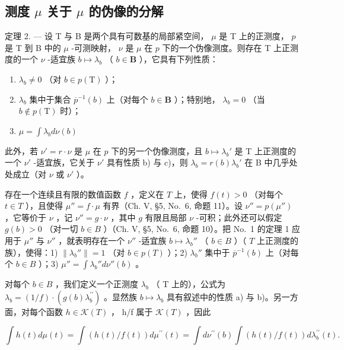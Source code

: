 \subsection{\texorpdfstring{测度 \(\mu\) 关于 \(\mu\) 的伪像的分解}{测度 mu 关于 mu 的伪像的分解}}

定理 2. --- 设 T 与 B 是两个具有可数基的局部紧空间， \(\mu\) 是 T 上的正测度， \(p\) 是 T 到 B 中的 \(\mu\) -可测映射， \(\nu\) 是 \(\mu\) 在 \(p\) 下的一个伪像测度。则存在 T 上正测度的一个 \(\nu\) -适宜族 \(b \mapsto \lambda_b\) （ \(b \in \mathbf{B}\) ），它具有下列性质：

\begin{enumerate}
\def\labelenumi{\alph{enumi})}
\item
  \(\lambda_{b} \neq 0\) （对 \(b \in p(\mathrm{T})\) ）；
\item
  \(\lambda_{b}\) 集中于集合 \(\overline{p}^{-1}(b)\) 上（对每个 \(b\in \mathbf{B}\) ）；特别地， \(\lambda_{b} = 0\) （当 \(b\notin p(\mathrm{T})\) 时）；
\item
  \(\mu = \int \lambda_b d\nu(b)\)
\end{enumerate}

此外，若 \(\nu' = r \cdot \nu\) 是 \(\mu\) 在 \(p\) 下的另一个伪像测度，且 \(b \mapsto \lambda_b'\) 是 T 上正测度的一个 \(\nu'\) -适宜族，它关于 \(\nu'\) 具有性质 b) 与 c)，则 \(\lambda_b = r(b)\lambda_b'\) 在 B 中几乎处处成立（对 \(\nu\) 或 \(\nu'\) ）。

存在一个连续且有限的数值函数 \(f\) ，定义在 \(T\) 上，使得 \(f(t) > 0\) （对每个 \(t \in T\) ），且使得 \(\mu'' = f \cdot \mu\) 有界（Ch. V, §5, No.~6, 命题 11）。设 \(\nu'' = p(\mu'')\) ，它等价于 \(\nu\) ，记 \(\nu'' = g \cdot \nu\) ，其中 \(g\) 有限且局部 \(\nu\) -可积；此外还可以假定 \(g(b) > 0\) （对一切 \(b \in B\) ）（Ch. V, §5, No.~6, 命题 10）。把 No.~1 的定理 1 应用于 \(\mu''\) 与 \(\nu''\) ，就表明存在一个 \(\nu''\) -适宜族 \(b \mapsto \lambda_b''\) （ \(b \in B\) ）（ \(T\) 上正测度的族），使得：1) \(\| \lambda_b'' \| = 1\) （对 \(b \in p(T)\) ）；2) \(\lambda_b''\) 集中于 \(\overline{p}^{-1}(b)\) 上（对每个 \(b \in B\) ）；3) \(\mu'' = \int \lambda_b'' d\nu''(b)\) 。

对每个 \(b \in B\) ，我们定义一个正测度 \(\lambda_{b}\) （ T 上的），公式为 \(\lambda_{b} = (1/f) \cdot (g(b)\lambda_{b}^{\prime\prime})\) 。显然族 \(b \mapsto \lambda_{b}\) 具有叙述中的性质 a) 与 b)。另一方面，对每个函数 \(h \in \mathcal{K}(T)\) ， h/f 属于 \(\mathcal{K}(T)\) ，因此

\[
\int h (t) d \mu (t) = \int \left(h (t) / f (t)\right) d \mu^ {\prime \prime} (t) = \int d \nu^ {\prime \prime} (b) \int \left(h (t) / f (t)\right) d \lambda_ {b} ^ {\prime \prime} (t).
\]

